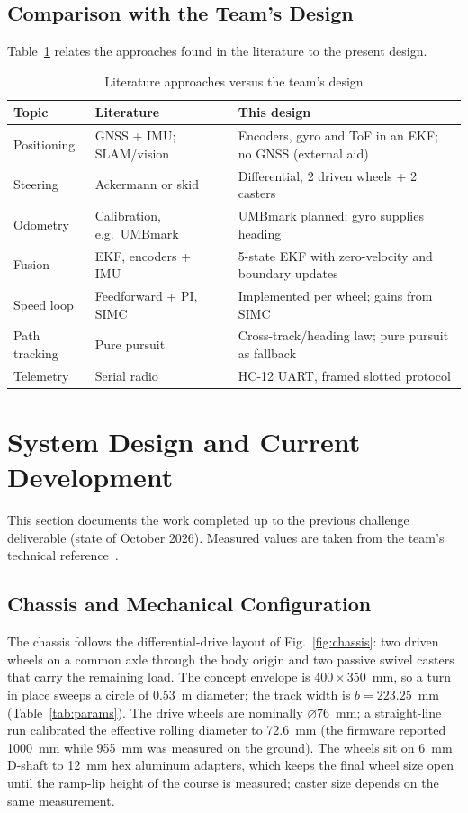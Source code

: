 \documentclass[conference]{IEEEtran}\newcommand{\haveieee}{}%
\begin{document}
\subsection{Comparison with the Team's Design}
Table~\ref{tab:sota} relates the approaches found in the literature to the present design.

\begin{table}[!t]
\caption{Literature approaches versus the team's design}
\label{tab:sota}
\centering\footnotesize
\setlength{\tabcolsep}{3pt}
\begin{tabular}{@{}p{1.6cm}p{2.9cm}p{3.1cm}@{}}
\toprule
\textbf{Topic} & \textbf{Literature} & \textbf{This design}\\
\midrule
Positioning & GNSS + IMU; SLAM/vision~\cite{wu2025,boros2026} & Encoders, gyro and ToF in an EKF; no GNSS (external aid)\\
Steering & Ackermann or skid~\cite{maclaurin2008,goodell2019} & Differential, 2 driven wheels + 2 casters\\
Odometry & Calibration, e.g.\ UMBmark~\cite{borenstein1996} & UMBmark planned; gyro supplies heading\\
Fusion & EKF, encoders + IMU~\cite{amorim2025} & 5-state EKF with zero-velocity and boundary updates\\
Speed loop & Feedforward + PI, SIMC~\cite{skogestad2003} & Implemented per wheel; gains from SIMC\\
Path tracking & Pure pursuit~\cite{giesbrecht2005,snider2009} & Cross-track/heading law; pure pursuit as fallback\\
Telemetry & Serial radio~\cite{hc12} & HC-12 UART, framed slotted protocol\\
\bottomrule
\end{tabular}
\end{table}

\section{System Design and Current Development}
This section documents the work completed up to the previous challenge deliverable (state of October 2026). Measured values are taken from the team's technical reference~\cite{techref}.

\subsection{Chassis and Mechanical Configuration}
The chassis follows the differential-drive layout of Fig.~\ref{fig:chassis}: two driven wheels on a common axle through the body origin and two passive swivel casters that carry the remaining load. The concept envelope is $400\times350$~mm, so a turn in place sweeps a circle of 0.53~m diameter; the track width is $b=223.25$~mm (Table~\ref{tab:params}). The drive wheels are nominally $\varnothing 76$~mm; a straight-line run calibrated the effective rolling diameter to 72.6~mm (the firmware reported 1000~mm while 955~mm was measured on the ground). The wheels sit on 6~mm D-shaft to 12~mm hex aluminum adapters, which keeps the final wheel size open until the ramp-lip height of the course is measured; caster size depends on the same measurement.
\end{document}
